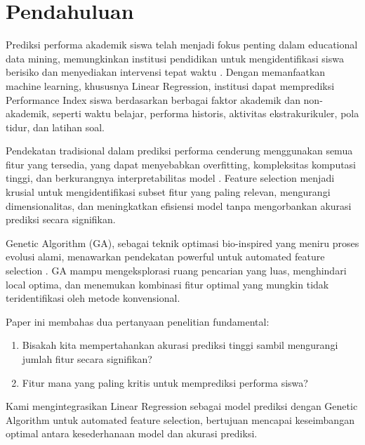 \documentclass[conference]{IEEEtran}
\begin{document}
\section{Pendahuluan}

Prediksi performa akademik siswa telah menjadi fokus penting dalam educational data mining, memungkinkan institusi pendidikan untuk mengidentifikasi siswa berisiko dan menyediakan intervensi tepat waktu \cite{romero2010educational}. Dengan memanfaatkan machine learning, khususnya Linear Regression, institusi dapat memprediksi Performance Index siswa berdasarkan berbagai faktor akademik dan non-akademik, seperti waktu belajar, performa historis, aktivitas ekstrakurikuler, pola tidur, dan latihan soal.

Pendekatan tradisional dalam prediksi performa cenderung menggunakan semua fitur yang tersedia, yang dapat menyebabkan overfitting, kompleksitas komputasi tinggi, dan berkurangnya interpretabilitas model \cite{kumar2017machine}. Feature selection menjadi krusial untuk mengidentifikasi subset fitur yang paling relevan, mengurangi dimensionalitas, dan meningkatkan efisiensi model tanpa mengorbankan akurasi prediksi secara signifikan.

Genetic Algorithm (GA), sebagai teknik optimasi bio-inspired yang meniru proses evolusi alami, menawarkan pendekatan powerful untuk automated feature selection \cite{xue2016survey,goldberg1989genetic}. GA mampu mengeksplorasi ruang pencarian yang luas, menghindari local optima, dan menemukan kombinasi fitur optimal yang mungkin tidak teridentifikasi oleh metode konvensional.

Paper ini membahas dua pertanyaan penelitian fundamental:
\begin{enumerate}
    \item Bisakah kita mempertahankan akurasi prediksi tinggi sambil mengurangi jumlah fitur secara signifikan?
    \item Fitur mana yang paling kritis untuk memprediksi performa siswa?
\end{enumerate}

Kami mengintegrasikan Linear Regression sebagai model prediksi dengan Genetic Algorithm untuk automated feature selection, bertujuan mencapai keseimbangan optimal antara kesederhanaan model dan akurasi prediksi.
\end{document}
